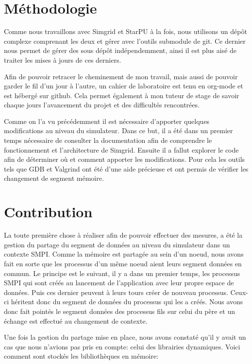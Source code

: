 \documentclass[smallextended]{svjour3}
\begin{document}
\section{Méthodologie}
\label{sec-4}
Comme nous travaillons avec Simgrid et StarPU à la fois, nous
utilisons un dépôt complexe comprenant les deux et gérer avec
l'outils submodule de git. Ce dernier nous permet de gérer des sous
dépôt indépendemment, ainsi il est plus aisé de traiter les mises à
jours de ces derniers.

Afin de pouvoir retracer le cheminement de mon travail, mais aussi
de pouvoir garder le fil d'un jour à l'autre, un cahier de
laboratoire est tenu en org-mode et est hébergé sur github. Cela permet
également à mon tuteur de stage de savoir chaque jours l'avancement
du projet et des difficultés rencontrées.

Comme on l'a vu précédemment il est nécessaire d'apporter quelques
modifications au niveau du simulateur. Dans ce but, il a été dans un
premier temps nécessaire de consulter la documentation afin de
comprendre le fonctionnement et l'architecture de Simgrid. Ensuite
il a fallut explorer le code afin de déterminer où et comment
apporter les modifications. Pour cela les outils tels que GDB et
Valgrind ont été d'une aide précieuse et ont permis de vérifier les
changement de segment mémoire.

\section{Contribution}
\label{sec-5}
La toute première chose à réaliser afin de pouvoir effectuer des
mesures, a été la gestion du partage du segment de données au niveau
du simulateur dans un contexte SMPI. Comme la mémoire est partagée
au sein d'un noeud, nous avons fait en sorte que les processus d'un
même noeud aient leurs segment données en commun. Le principe est le
suivant, il y a dans un premier temps, les processus SMPI qui sont
créés au lancement de l'application avec leur propre espace de
données. Puis ces dernier peuvent à leurs tours créer de nouveau
processus. Ceux-ci héritent donc du segment de données du processus
qui les a créés. Nous avons donc fait pointés le segment données des
processus fils sur celui du père et un échange est effectué au
changement de contexte.

Une fois la gestion du partage mise en place, nous avons constaté
qu'il y avait un cas que nous n'avions pas pris en compte: celui des
librairies dynamiques. Voici comment sont stockés les bibliothèques
en mémoire:
\end{document}
